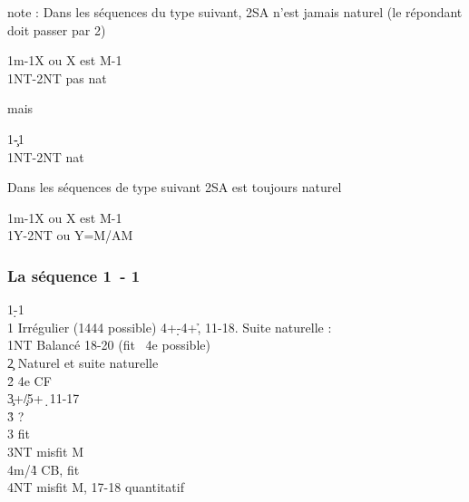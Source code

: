 \documentclass[a4paper]{article}
\begin{document}
note :	Dans les séquences du type suivant, 2SA n’est jamais naturel (le répondant doit passer par 2\s )

\begin{bidtable}
1m-1X \> ou X est M-1\\
1NT-2NT \> pas nat
\end{bidtable}

mais

\begin{bidtable}
1\c-1\s\\
1NT-2NT \> nat
\end{bidtable}

Dans les séquences de type suivant 2SA est toujours naturel

\begin{bidtable}
1m-1X \> ou X est M-1\\
1Y-2NT \> ou Y=M/AM
\end{bidtable}

\subsubsection{La séquence 1\pdfd\ - 1\pdfh}

\begin{bidtable}
1\d-1\h\\
1\s \> Irrégulier (1444 possible) 4+\d -4+\h , 11-18. Suite naturelle :\\
1NT \> Balancé 18-20 (fit \s\ 4e possible)\\
2\c \> Naturel et suite naturelle\+\\
2\h \> 4e CF\+\\
3\c {}+\c /5+\d\ 11-17\-\\
3\h \> ?\+\\
3\s \> fit \s \\
3NT \> misfit M\\
4m/4\h \> CB, fit \h \\
4NT \> misfit M, 17-18 quantitatif\-\-
\end{bidtable}
\end{document}
